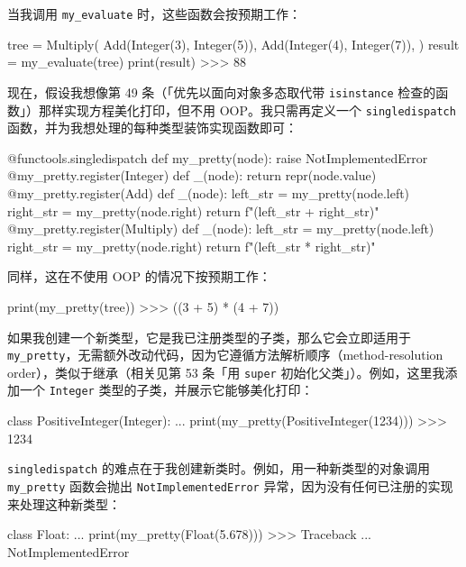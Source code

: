 当我调用 \texttt{my\_evaluate} 时，这些函数会按预期工作：

\begin{codebox}[python]
tree = Multiply(
    Add(Integer(3), Integer(5)),
    Add(Integer(4), Integer(7)),
)
result = my_evaluate(tree)
print(result)
>>>
88
\end{codebox}

现在，假设我想像第 49 条（「优先以面向对象多态取代带 \texttt{isinstance} 检查的函数」）那样实现方程美化打印，但不用 OOP。我只需再定义一个 \texttt{singledispatch} 函数，并为我想处理的每种类型装饰实现函数即可：

\begin{codebox}[python]
@functools.singledispatch
def my_pretty(node):
    raise NotImplementedError
@my_pretty.register(Integer)
def _(node):
    return repr(node.value)
@my_pretty.register(Add)
def _(node):
    left_str = my_pretty(node.left)
    right_str = my_pretty(node.right)
    return f"({left_str} + {right_str})"
@my_pretty.register(Multiply)
def _(node):
    left_str = my_pretty(node.left)
    right_str = my_pretty(node.right)
    return f"({left_str} * {right_str})"
\end{codebox}

同样，这在不使用 OOP 的情况下按预期工作：

\begin{codebox}[python]
print(my_pretty(tree))
>>>
((3 + 5) * (4 + 7))
\end{codebox}

如果我创建一个新类型，它是我已注册类型的子类，那么它会立即适用于 \texttt{my\_pretty}，无需额外改动代码，因为它遵循方法解析顺序（method-resolution order），类似于继承（相关见第 53 条「用 \texttt{super} 初始化父类」）。例如，这里我添加一个 \texttt{Integer} 类型的子类，并展示它能够美化打印：

\begin{codebox}[python]
class PositiveInteger(Integer):
    ...
print(my_pretty(PositiveInteger(1234)))
>>>
1234
\end{codebox}

\texttt{singledispatch} 的难点在于我创建新类时。例如，用一种新类型的对象调用 \texttt{my\_pretty} 函数会抛出 \texttt{NotImplementedError} 异常，因为没有任何已注册的实现来处理这种新类型：

\begin{codebox}[python]
class Float:
    ...
print(my_pretty(Float(5.678)))
>>>
Traceback ...
NotImplementedError
\end{codebox}

